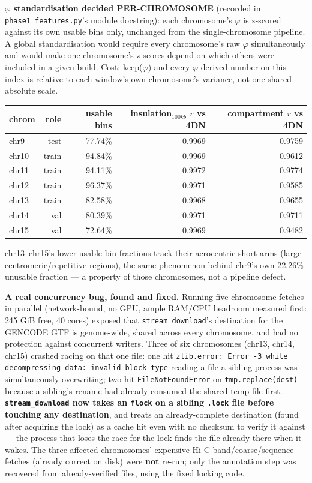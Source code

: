 \documentclass[11pt,a4paper]{article}
\newcommand{\code}[1]{\texttt{\small #1}}
\newcommand{\warn}[1]{\textcolor{warncol}{\textbf{#1}}}
\begin{document}
\textbf{$\varphi$ standardisation decided PER-CHROMOSOME} (recorded in
\code{phase1\_features.py}'s module docstring): each chromosome's $\varphi$ is
z-scored against its own usable bins only, unchanged from the
single-chromosome pipeline. A global standardisation would require every
chromosome's raw $\varphi$ simultaneously and would make one chromosome's
z-scores depend on which others were included in a given build. Cost:
keep($\varphi$) and every $\varphi$-derived number on this index is relative
to each window's own chromosome's variance, not one shared absolute scale.

\begin{center}
\begin{tabular}{lrrrr}
\toprule
chrom & role & usable bins & insulation$_{100kb}$ $r$ vs 4DN & compartment $r$ vs 4DN \\
\midrule
chr9  & test  & 77.74\% & 0.9969 & 0.9759 \\
chr10 & train & 94.84\% & 0.9969 & 0.9612 \\
chr11 & train & 94.11\% & 0.9972 & 0.9774 \\
chr12 & train & 96.37\% & 0.9971 & 0.9585 \\
chr13 & train & 82.58\% & 0.9968 & 0.9655 \\
chr14 & val   & 80.39\% & 0.9971 & 0.9711 \\
chr15 & val   & 72.64\% & 0.9969 & 0.9482 \\
\bottomrule
\end{tabular}
\end{center}

chr13--chr15's lower usable-bin fractions track their acrocentric short arms
(large centromeric/repetitive regions), the same phenomenon behind chr9's own
22.26\% unusable fraction --- a property of those chromosomes, not a pipeline
defect.

\textbf{A real concurrency bug, found and fixed.} Running five chromosome
fetches in parallel (network-bound, no GPU, ample RAM/CPU headroom measured
first: 245 GiB free, 40 cores) exposed that \code{stream\_download}'s
destination for the GENCODE GTF is genome-wide, shared across every
chromosome, and had no protection against concurrent writers. Three of six
chromosomes (chr13, chr14, chr15) crashed racing on that one file: one hit
\code{zlib.error: Error -3 while decompressing data: invalid block type}
reading a file a sibling process was simultaneously overwriting; two hit
\code{FileNotFoundError} on \code{tmp.replace(dest)} because a sibling's
rename had already consumed the shared temp file first.
\warn{\code{stream\_download} now takes an \code{flock} on a sibling
\code{.lock} file before touching any destination}, and treats an
already-complete destination (found after acquiring the lock) as a cache hit
even with no checksum to verify it against --- the process that loses the race
for the lock finds the file already there when it wakes. The three affected
chromosomes' expensive Hi-C band/coarse/sequence fetches (already correct on
disk) were \textbf{not} re-run; only the annotation step was recovered from
already-verified files, using the fixed locking code.
\end{document}
